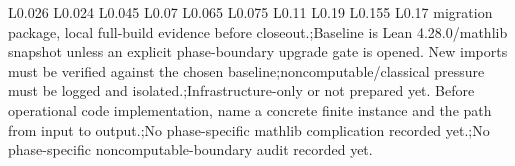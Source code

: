 \begin{longtable}{L{0.026\linewidth} L{0.024\linewidth} L{0.045\linewidth} L{0.07\linewidth} L{0.065\linewidth} L{0.075\linewidth} L{0.11\linewidth} L{0.19\linewidth} L{0.155\linewidth} L{0.17\linewidth}}
migration package, local full-build evidence before closeout.;\newline Baseline is Lean 4.28.0/\allowbreak{}mathlib snapshot unless an explicit phase-boundary upgrade gate is opened. New imports must be verified against the chosen baseline;\newline noncomputable/\allowbreak{}classical pressure must be logged and isolated.;\newline Infrastructure-only or not prepared yet. Before operational code implementation, name a concrete finite instance and the path from input to output.;\newline No phase-specific mathlib complication recorded yet.;\newline No phase-specific noncomputable-boundary audit recorded yet.\\
\hline
\addlinespace[0.24em]

\end{longtable}
